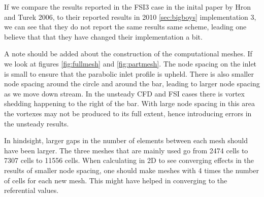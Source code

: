 If we compare the results reported in the FSI3 case in the inital paper by Hron and Turek 2006, to their reported results in 2010 \ref{sec:bigboys} implementation 3, we can see that they do not report the same results same scheme, leading one believe that that they have changed their implementation a bit. 

A note should be added about the construction of the computational meshes. If we look at figures \ref{fig:fullmesh} and \ref{fig:partmesh}. The node spacing on the inlet is small to ensure that the parabolic inlet profile is upheld. There is also smaller node spacing around the circle and around the bar, leading to larger node spacing as we move down stream. In the unsteady CFD and FSI cases there is vortex shedding happening to the right of the bar. With large node spacing in this area the vortexes may not be produced to its full extent, hence introducing errors in the unsteady results. 

In hindsight, larger gaps in the number of elements between each mesh should have been larger. The three meshes that are mainly used go from 2474 cells to 7307 cells to 11556 cells. When calculating in 2D to see converging effects in the results of smaller node spacing, one should make meshes with 4 times the number of cells for each new mesh. This might have helped in converging to the referential values.

